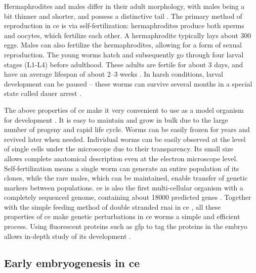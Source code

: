 Hermaphrodites and males differ in their adult morphology, with males being a bit thinner and shorter, and possess a distinctive tail \citep{corsi2015transparent}. The primary method of reproduction in \ac{ce} is via self-fertilization: hermaphrodites produce both sperms and oocytes, which fertilize each other. A hermaphrodite typically lays about 300 eggs. Males can also fertilize the hermaphrodites, allowing for a form of sexual reproduction. The young worms hatch and subsequently go through four larval stages (L1-L4) before adulthood. These adults are fertile for about \num{3} days, and have an average lifespan of about \numrange{2}{3} weeks \citep{corsi2015transparent}. In harsh conditions, larval development can be paused -- these worms can survive several months in a special state called dauer arrest \citep{hu2007dauer}.

The above properties of \ac{ce} make it very convenient to use as a model organism for development \citep{corsi2015transparent,brenner1974genetics}. It is easy to maintain and grow in bulk due to the large number of progeny and rapid life cycle. Worms can be easily frozen for years and revived later when needed. Individual worms can be easily observed at the level of single cells under the microscope due to their transparency. Its small size allows complete anatomical description even at the electron microscope level. Self-fertilization means a single worm can generate an entire population of its clones, while the rare males, which can be maintained, enable transfer of genetic markers between populations. \ac{ce} is also the first multi-cellular organism with a completely sequenced genome, containing about 18000 predicted genes \citep{c1998genome}. Together with the simple feeding method of double stranded \ac{rnai} in \ac{ce} \citep{kamath2003genome}, all these properties of \ac{ce} make genetic perturbations in \ac{ce} worms a simple and efficient process. Using fluorescent proteins such as \ac{gfp} to tag the proteins in the embryo allows in-depth study of its development \citep{chalfie1994green,boulin2006reporter}.

\subsection{Early embryogenesis in \acs{ce}}\label{subsec:EarlyEmbryoCelegans}

